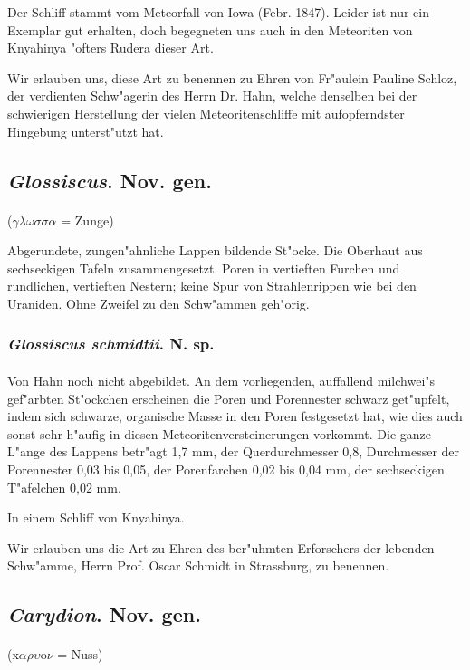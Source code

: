 \documentclass[a4paper, 11pt, oneside]{article}
\begin{document}
Der Schliff stammt vom Meteorfall von Iowa (Febr. 1847). Leider ist nur ein Exemplar gut erhalten, doch begegneten uns auch in den Meteoriten von Knyahinya "ofters Rudera dieser Art.

Wir erlauben uns, diese Art zu benennen zu Ehren von Fr"aulein Pauline Schloz, der verdienten Schw"agerin des Herrn Dr. Hahn, welche denselben bei der schwierigen Herstellung der vielen Meteoritenschliffe mit aufopferndster Hingebung unterst"utzt hat.
\subsection{\emph{Glossiscus}. Nov. gen.}
\paragraph{}
($\gamma\lambda\omega\sigma\sigma\alpha$ = Zunge)%

Abgerundete, zungen"ahnliche Lappen bildende St"ocke. Die Oberhaut aus sechseckigen Tafeln zusammengesetzt. Poren in vertieften Furchen und rundlichen, vertieften Nestern; keine Spur von Strahlenrippen wie bei den Uraniden. Ohne Zweifel zu den Schw"ammen geh"orig.
\subsubsection{\emph{Glossiscus schmidtii}. N. sp.}
\paragraph{}
Von Hahn noch nicht abgebildet. An dem vorliegenden, auffallend milchwei"s gef"arbten St"ockchen erscheinen die Poren und Porennester schwarz get"upfelt, indem sich schwarze, organische Masse in den Poren festgesetzt hat, wie dies auch sonst sehr h"aufig in diesen Meteoritenversteinerungen vorkommt. Die ganze L"ange des Lappens betr"agt 1,7 mm, der Querdurchmesser 0,8, Durchmesser der Porennester 0,03 bis 0,05, der Porenfarchen 0,02 bis 0,04 mm, der sechseckigen T"afelchen 0,02 mm.

In einem Schliff von Knyahinya.

Wir erlauben uns die Art zu Ehren des ber"uhmten Erforschers der lebenden Schw"amme, Herrn Prof. Oscar Schmidt in Strassburg, zu benennen.
\subsection{\emph{Carydion}. Nov. gen.}
\paragraph{}
(x$\alpha\rho\upsilon$o$\nu$ = Nuss)%
\end{document}
